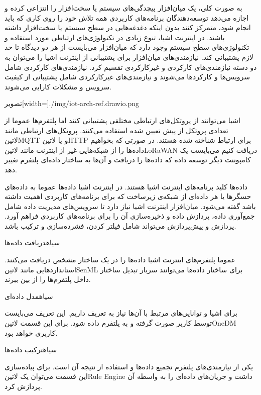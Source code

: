 
به صورت کلی، یک میان‌افزار پیچدگی‌های سیستم یا سخت‌افزار را انتزاعی کرده و اجازه می‌دهد
توسعه‌دهندگان برنامه‌های کاربردی همه تلاش خود را روی کاری که باید انجام شود، متمرکز کنند بدون
اینکه دغدغه‌هایی در سطح سیستم یا سخت‌افزار داشته باشند.
در اینترنت اشیا، تنوع زیادی در تکنولوژی‌های ارتباطی مورد استفاده و تکنولوژی‌های سطح سیستم وجود دارد که
میان‌افزار می‌بایست از هر دو دیدگاه تا حد لازم پشتیبانی کند.
نیازمندی‌های میان‌افزار برای پشتیبانی از اینترنت اشیا را می‌توان به دو دسته نیازمندی‌های کارکردی و غیرکارکردی تقسیم کرد.
نیازمندی‌های کارکردی شامل سرویس‌ها و کارکردها می‌شوند و نیازمندی‌های غیرکارکردی شامل پشتیبانی از کیفیت سرویس
و مشکلات کارایی می‌شوند.

‌تصویر[width=\textwidth]{./img/iot-arch-ref.drawio.png}


اشیا می‌توانند از پروتکل‌های ارتباطی مختلفی پشتیبانی کنند اما پلتفرم‌ها عموما از تعدادی پروتکل از پیش تعیین شده استفاده می‌کنند.
پروتکل‌های ارتباطی مانند ‌لاتین{MQTT}
و یا ‌لاتین{HTTP} برای ارتباط شناخته شده هستند.
در صورتی که بخواهیم داده‌ها را از شبکه‌هایی غیر از اینترنت مانند ‌لاتین{LoRaWAN}
دریافت کنیم می‌بایست یک کامپوننت دیگر توسعه داده که داده‌ها را دریافت و آن‌ها به ساختار
داده‌ای پلتفرم تغییر دهد.


داده‌ها کلید برنامه‌های اینترنت اشیا هستند. در اینترنت اشیا داده‌ها عموما به داده‌های حسگرها
یا هر داده‌ای از شبکه‌ی زیرساخت که برای برنامه‌های کاربردی اهمیت داشته باشد گفته می‌شود.
میان‌افزار اینترنت اشیا نیاز دارد تا سرویس‌های مدیریت داده شامل جمع‌آوری داده، پردازش داده و ذخیره‌سازی
آن را برای برنامه‌های کاربردی فراهم آورد.
پردازش و پیش‌پردازش می‌تواند شامل فیلتر کردن، فشرده‌سازی و ترکیب باشد.

‌سیاه{دریافت داده‌ها}

عموما پلتفرم‌های اینترنت اشیا داده‌ها را در یک ساختار مشخص
دریافت می‌کنند.
استانداردهایی مانند ‌لاتین{SenML} برای ساختار داده‌ها می‌توانند سربار تبدیل
ساختار داخل پلتفرم‌ها را از بین ببرند.

‌سیاه{مدل داده‌ای}

برای اشیا و توانایی‌های مرتبط با آن‌ها نیاز به تعریف داریم. این تعریف می‌بایست توسط کاربر صورت
گرفته و به پلتفرم داده شود. برای این قسمت ‌لاتین{OneDM} کاربری خواهد بود.

‌سیاه{ترکیب داده‌ها}

یکی از نیازمندی‌های پلتفرم تجمیع داده‌ها و استفاده از نتیجه آن است.
برای پیاده‌سازی این قسمت می‌توان یک ‌لاتین{Rule Engine} داشت و جریان‌های داده‌ای
را به واسطه آن پردازش کرد.

